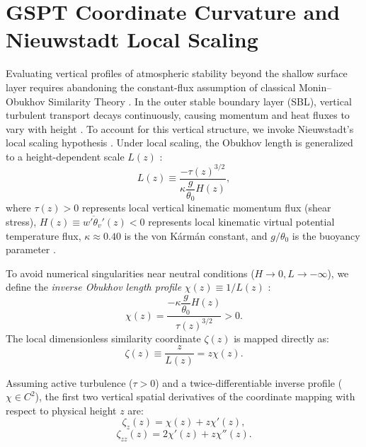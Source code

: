 \section{GSPT Coordinate Curvature and Nieuwstadt Local Scaling}
\label{sec:coordinate_curvature}

Evaluating vertical profiles of atmospheric stability beyond the shallow surface layer requires abandoning the constant-flux assumption of classical Monin--Obukhov Similarity Theory \cite{sheba2002}. In the outer stable boundary layer (SBL), vertical turbulent transport decays continuously, causing momentum and heat fluxes to vary with height \cite{nieuwstadt1984, sheba2002}. To account for this vertical structure, we invoke Nieuwstadt's local scaling hypothesis \cite{nieuwstadt1984}. Under local scaling, the Obukhov length is generalized to a height-dependent scale $L(z)$ \cite{nieuwstadt1984}:
\begin{equation}
    L(z) \equiv \frac{-\tau(z)^{3/2}}{\kappa \dfrac{g}{\theta_0} H(z)}, \label{eq:local_obukhov_length}
\end{equation}
where $\tau(z) > 0$ represents local vertical kinematic momentum flux (shear stress), $H(z) \equiv \overline{w'\theta_v'}(z) < 0$ represents local kinematic virtual potential temperature flux, $\kappa \approx 0.40$ is the von K\'arm\'an constant, and $g/\theta_0$ is the buoyancy parameter \cite{businger1971}.

To avoid numerical singularities near neutral conditions ($H \to 0, L \to -\infty$), we define the \textit{inverse Obukhov length profile} $\chi(z) \equiv 1/L(z)$ \cite{nieuwstadt1984}:
\begin{equation}
    \chi(z) = \frac{-\kappa \dfrac{g}{\theta_0} H(z)}{\tau(z)^{3/2}} > 0. \label{eq:inverse_obukhov_def}
\end{equation}
The local dimensionless similarity coordinate $\zeta(z)$ is mapped directly as:
\begin{equation}
    \zeta(z) \equiv \frac{z}{L(z)} = z \chi(z). \label{eq:inverse_similarity_coord}
\end{equation}

Assuming active turbulence ($\tau > 0$) and a twice-differentiable inverse profile ($\chi \in C^2$), the first two vertical spatial derivatives of the coordinate mapping with respect to physical height $z$ are:
\begin{equation}
    \zeta_z(z) = \chi(z) + z \chi'(z), \label{eq:zeta_z_analytic}
\end{equation}
\begin{equation}
    \zeta_{zz}(z) = 2\chi'(z) + z \chi''(z). \label{eq:zeta_zz_analytic}
\end{equation}

